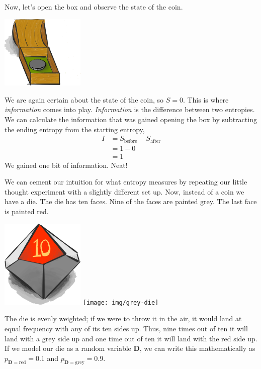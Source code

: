 Now, let's open the box and observe the state of the coin.
\begin{center}
\includegraphics[width=0.3\textwidth]{img/big-box-open-coin}
\end{center}
We are again certain about the state of the coin, so $S = 0$.
This is where \textit{information} comes into play.
\textit{Information} is the difference between two entropies.
We can calculate the information that was gained opening the box by subtracting the ending entropy from the starting entropy,
\begin{align*}
I
&= S_{\text{before}} - S_{\text{after}} \\
&= 1 - 0 \\
&= 1
\end{align*}
We gained one bit of information.
Neat!

We can cement our intuition for what entropy measures by repeating our little thought experiment with a slightly different set up.
Now, instead of a coin we have a die.
The die has ten faces.
Nine of the faces are painted grey.
The last face is painted red.
\begin{center}
\includegraphics[width=0.3\textwidth]{img/red-die}
\texttt{[image: img/grey-die]}
\end{center}
The die is evenly weighted;
if we were to throw it in the air, it would land at equal frequency with any of its ten sides up.
Thus, nine times out of ten it will land with a grey side up and one time out of ten it will land with the red side up.
If we model our die as a random variable $\bm{D}$, we can write this mathematically as $p_{\bm{D} = \text{red}} = 0.1$ and $p_{\bm{D} = \text{grey}} = 0.9$.

